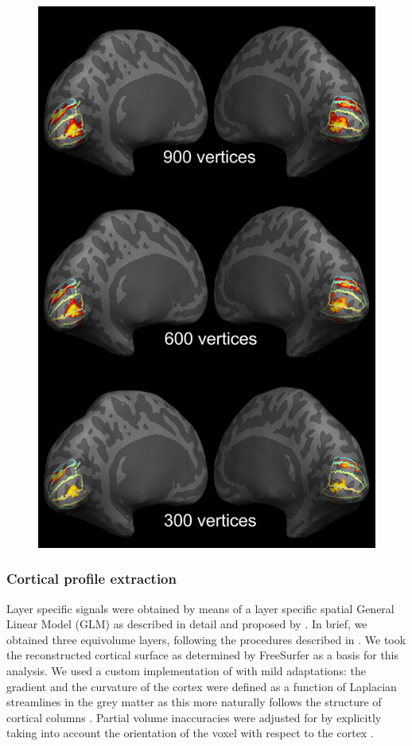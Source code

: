 \documentclass[9pt,lineno]{aperture}
\begin{document}
\begin{figure}
{\includegraphics[width=0.75\linewidth]{img/suppmat/ROI_on_surface_lowres}}
\label{figsupp:surface_plot}

\end{figure}



\subsubsection{Cortical profile extraction}
Layer specific signals were obtained by means of a layer specific spatial General Linear Model (GLM) as described in detail and proposed by \citep{VanMourik2018}. In brief, we obtained three equivolume layers, following the procedures described in \citep{Waehnert2014}. We took the reconstructed cortical surface as determined by FreeSurfer \citep{Dale1999} as a basis for this analysis. We used a custom implementation of \citet{Waehnert2014} with mild adaptations: the gradient and the curvature of the cortex were defined as a function of Laplacian streamlines in the grey matter as this more naturally follows the structure of cortical columns \citep{Leprince2015}. Partial volume inaccuracies were adjusted for by explicitly taking into account the orientation of the voxel with respect to the cortex \citep{VanMourik2019}.
\end{document}
